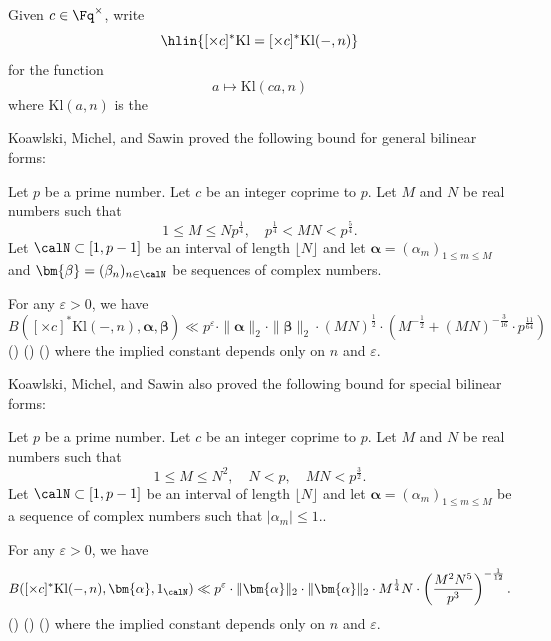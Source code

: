 \begin{notation}  \label{notation:pullback_of_kloosterman_sum_by_multiplication}
    Given $c \in \Fq^\times$, write 
    $$\hlin{[\times c]^* \mathrm{Kl} = [\times c]^* \mathrm{Kl}(-, n)}$$
    for the function
    $$a \mapsto \mathrm{Kl}(ca, n)$$
    where $\mathrm{Kl}(a, n)$ is the 
\end{notation}

Koawlski, Michel, and Sawin proved the following bound for general bilinear forms:
\begin{theorem} \label{theorem:kowalski_michel_sawin_bfksa_bound_for_general_bilinear_forms}
    Let $p$ be a prime number. Let $c$ be an integer coprime to $p$. Let $M$ and $N$ be real numbers such that 
    $$1 \leq M \leq Np^{\frac{1}{4}}, \quad p^{\frac{1}{4}} < MN < p^{\frac{5}{4}}.$$    
    Let $\calN \subset [1,p-1]$ be an interval of length $\lfloor N \rfloor$ and let $\bm{\alpha} = (\alpha_m)_{1 \leq m \leq M}$ and $\bm{\beta} = (\beta_n)_{n \in \calN}$ be sequences of complex numbers.

    For any $\varepsilon > 0$, we have 
    $$B([\times c]^* \mathrm{Kl}(-, n), \bm{\alpha}, \bm{\beta}) \ll p^\varepsilon \cdot \|\bm{\alpha}\|_2 \cdot \|\bm{\beta}\|_2 \cdot (MN)^{\frac{1}{2}} \cdot \left(M^{-\frac{1}{2}} + (MN)^{-\frac{3}{16}} \cdot  p^{\frac{11}{64}} \right)$$
    () () ()
    where the implied constant depends only on $n$ and $\varepsilon$.
\end{theorem}

Koawlski, Michel, and Sawin also proved the following bound for special bilinear forms:
\begin{theorem} \label{theorem:kowalski_michel_sawin_bfksa_bound_for_special_bilinear_forms}
    Let $p$ be a prime number. Let $c$ be an integer coprime to $p$. Let $M$ and $N$ be real numbers such that 
    $$1 \leq M \leq N^2, \quad N < p, \quad MN < p^{\frac{3}{2}}.$$    
    Let $\calN \subset [1,p-1]$ be an interval of length $\lfloor N \rfloor$ and let $\bm{\alpha} = (\alpha_m)_{1 \leq m \leq M}$ be a sequence of complex numbers such that $|\alpha_m| \leq 1$..

    For any $\varepsilon > 0$, we have 
    $$B([\times c]^* \mathrm{Kl}(-, n), \bm{\alpha}, 1_{\calN}) \ll p^\varepsilon \cdot \|\bm{\alpha}\|_2 \cdot \|\bm{\alpha}\|_2 \cdot M^{\frac{1}{4}} N \cdot \left(\frac{M^2 N^5}{p^3} \right)^{-\frac{1}{12}}.$$
    () () ()
    where the implied constant depends only on $n$ and $\varepsilon$.
\end{theorem}


